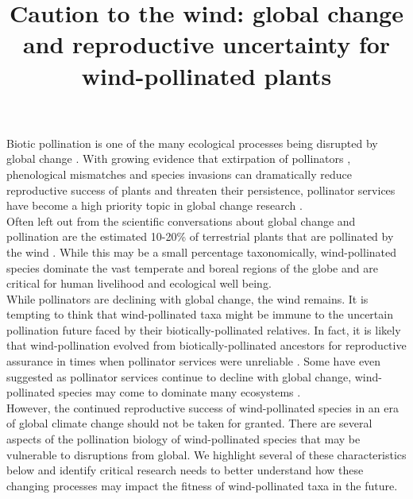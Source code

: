 \documentclass[11pt]{article}
\title{Caution to the wind: global change and reproductive uncertainty for wind-pollinated plants}
\begin{document}
\maketitle


\noindent Biotic pollination is one of the many ecological processes being disrupted by global change \citep{Gerard:2020aa}. With growing evidence that extirpation of pollinators \citep{Burkle:2013aa}, phenological mismatches \citep{Memmott2007} and species invasions \citep{Dietzsch:2011aa} can dramatically reduce reproductive success of plants and threaten their persistence, pollinator services have become a high priority topic in global change research \citep{Dicks975,Kremen:2000aa}.\\

\noindent Often left out from the scientific conversations about global change and pollination are the estimated 10-20\% of terrestrial plants that are pollinated by the wind \citep{Ollerton:2011aa,Friedman:2009aa,Ackerman:2000aa}. While this may be a small percentage taxonomically, wind-pollinated species dominate the vast temperate and boreal regions of the globe \citep{Regal:1982aa} and are critical for human livelihood and ecological well being.\\

\noindent While pollinators are declining with global change, the wind remains. %
It is tempting to think that wind-pollinated taxa might be immune to the uncertain pollination future faced by their biotically-pollinated relatives. In fact, it is likely that wind-pollination evolved from biotically-pollinated ancestors for reproductive assurance in times when pollinator services were unreliable \citep{Friedman:2009aa}. Some have even suggested as pollinator services continue to decline with global change, wind-pollinated species may come to dominate many ecosystems \citep{Bond:1995aa,Hoiss:2013aa}.\\

\noindent However, the continued reproductive success of wind-pollinated species in an era of global climate change should not be taken for granted. There are several aspects of the pollination biology of wind-pollinated species that may be vulnerable to disruptions from global. We highlight several of these characteristics below and identify critical research needs to better understand how these changing processes may impact the fitness of wind-pollinated taxa in the future.\\
\end{document}

